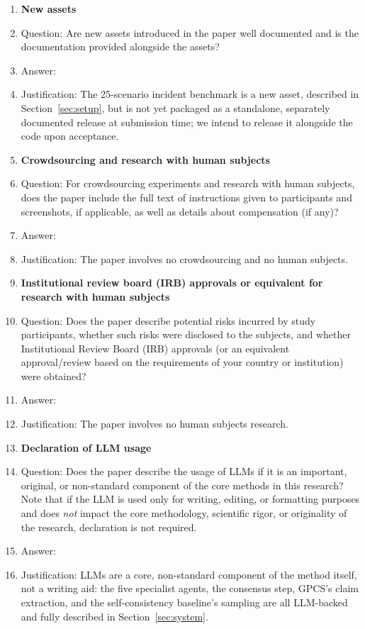 \begin{enumerate}
\item {\bf New assets}
    \item[] Question: Are new assets introduced in the paper well documented and is the documentation provided alongside the assets?
    \item[] Answer: \answerNo{}
    \item[] Justification: The 25-scenario incident benchmark is a new asset, described in Section~\ref{sec:setup}, but is not yet packaged as a standalone, separately documented release at submission time; we intend to release it alongside the code upon acceptance.

\item {\bf Crowdsourcing and research with human subjects}
    \item[] Question: For crowdsourcing experiments and research with human subjects, does the paper include the full text of instructions given to participants and screenshots, if applicable, as well as details about compensation (if any)?
    \item[] Answer: \answerNA{}
    \item[] Justification: The paper involves no crowdsourcing and no human subjects.

\item {\bf Institutional review board (IRB) approvals or equivalent for research with human subjects}
    \item[] Question: Does the paper describe potential risks incurred by study participants, whether such risks were disclosed to the subjects, and whether Institutional Review Board (IRB) approvals (or an equivalent approval/review based on the requirements of your country or institution) were obtained?
    \item[] Answer: \answerNA{}
    \item[] Justification: The paper involves no human subjects research.

\item {\bf Declaration of LLM usage}
    \item[] Question: Does the paper describe the usage of LLMs if it is an important, original, or non-standard component of the core methods in this research? Note that if the LLM is used only for writing, editing, or formatting purposes and does \emph{not} impact the core methodology, scientific rigor, or originality of the research, declaration is not required.
    \item[] Answer: \answerYes{}
    \item[] Justification: LLMs are a core, non-standard component of the method itself, not a writing aid: the five specialist agents, the consensus step, GPCS's claim extraction, and the self-consistency baseline's sampling are all LLM-backed and fully described in Section~\ref{sec:system}.

\end{enumerate}
